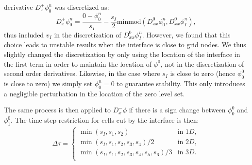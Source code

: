 \documentclass[english]{article}
\begin{document}
derivative $D^+_x\phi^n_0$ was discretized as:
\begin{equation*}
D^+_x\phi^n_0 = \frac{0-\phi_0^n}{s_I} -
\frac{s_I}{2}\text{minmod}\left(D^0_{xx}\phi^n_0,D^0_{xx}\phi^n_I\right),
\end{equation*}
thus included $v_I$ in the discretization of $D^0_{xx}\phi^n_I$. However,
we found that this choice leads to unstable results when the interface is
close to grid nodes. We thus slightly changed the discretization by only
using the location of the interface in the first term in order to maintain
the location of $\phi^0$, not in the discretization of second order
derivatives. Likewise, in the case where $s_I$ is close to zero (hence
$\phi^0_0$ is close to zero) we simply set $\phi^n_0=0$ to guarantee
stability. This only introduces a negligible perturbation in the location
of the zero level set.

The same process is then applied to $D^-_x\phi$ if there is a sign change between $\phi^0_0$ and
$\phi^0_1$. The time step restriction for cells cut by the interface is then:
\begin{eqnarray}
\Delta \tau = \begin{cases}
\min(s_I,s_1,s_2)                   & \textrm{in $1D$}, \\
\min(s_I,s_1,s_2,s_3,s_4)/2         & \textrm{in $2D$}, \\
\min(s_I,s_1,s_2,s_3,s_4,s_5,s_6)/3 & \textrm{in $3D$}. \\
\end{cases}
\end{eqnarray}
\end{document}
